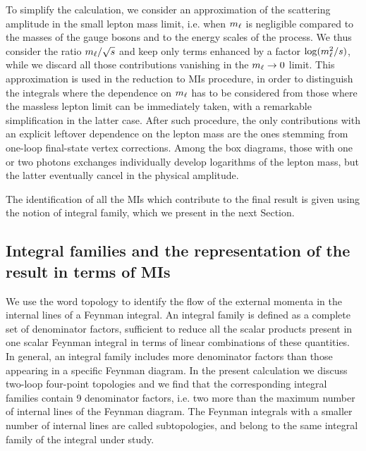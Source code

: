 \documentclass[11pt,a4paper]{article}
\begin{document}
To simplify the calculation,
we consider an approximation of the scattering amplitude in the small lepton mass limit,
i.e. when $m_\ell$ is negligible compared
to the masses of the gauge bosons and to the energy scales of the process.
We thus consider the ratio $m_\ell/\sqrt{s}$
and keep only terms enhanced by a factor $\log(m_\ell^2/s)$,
while we discard all those contributions vanishing in the $m_\ell\to 0$ limit.
This approximation is used in the reduction to MIs procedure,
in order to distinguish the integrals where the dependence on $m_\ell$ has to be considered
from those where the massless lepton limit can be immediately taken,
with a remarkable simplification in the latter case.
After such procedure,
the only contributions with an explicit leftover dependence on the lepton mass
are the ones stemming from one-loop final-state vertex corrections.
Among the box diagrams, those with one or two photons exchanges
individually develop logarithms of the lepton mass,
but the latter eventually cancel \cite{Frenkel:1976bj}
in the physical amplitude.

The identification of all the MIs which contribute to the final result
is given
using the notion of integral family, which we present in the next Section.



\subsection{Integral families and the representation of the result in terms of MIs}
%
We use the word topology to identify the flow of the external momenta
in the internal lines of a Feynman integral.
An integral family is defined as a complete set of denominator factors,
sufficient to reduce all the scalar products present in one scalar Feynman integral
in terms of linear combinations of these quantities.
In general, an integral family includes more denominator factors
than those appearing in a specific Feynman diagram.
In the present calculation we discuss two-loop four-point topologies
and we find that the corresponding integral families contain 9 denominator factors,
i.e. two more than the maximum number of internal lines of the Feynman diagram.
The Feynman integrals with a smaller number of internal lines
are called subtopologies, and belong to the same integral family of the
integral under study.
\end{document}
